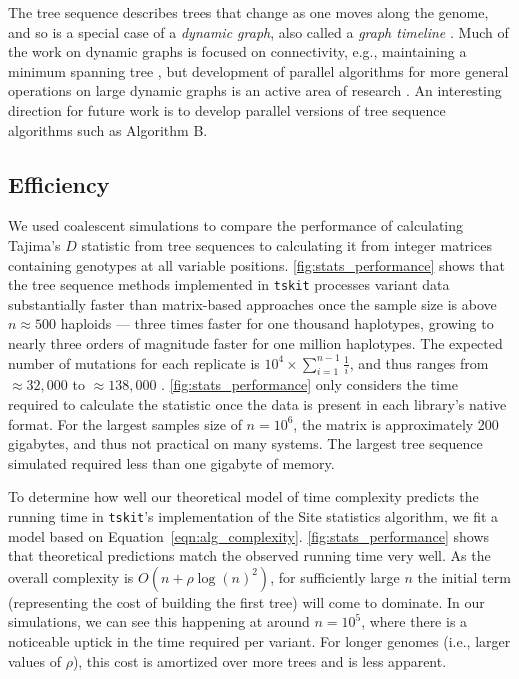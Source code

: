 \documentclass[9pt,twoside,lineno]{gsajnl}
\newcommand{\tskit}{{\texttt{tskit}}}
\begin{document}
The tree sequence describes trees that change as one moves along the genome,
and so is a special case of a \emph{dynamic graph},
also called a \emph{graph timeline} \citep{lacki2013reachability}.
Much of the work on dynamic graphs is focused on connectivity,
e.g., maintaining a minimum spanning tree \citep{eppstein1994offline, eppstein1997sparsification, holm2001polylogarithmic},
but development of parallel algorithms for more general operations on large dynamic graphs
is an active area of research \citep[e.g.,][]{srinivasan2018sharedmemory}.
An interesting direction for future work is to develop
parallel versions of tree sequence algorithms such as Algorithm B.

\subsection*{Efficiency}

We used coalescent simulations to compare the performance of calculating Tajima's \citeyearpar{Tajima1989-de} $D$
statistic from tree sequences to calculating it from integer matrices containing genotypes at all variable positions.
\autoref{fig:stats_performance} shows that the tree sequence methods implemented in \texttt{tskit} processes variant data
substantially faster than matrix-based approaches once the sample size is above $n \approx 500$ haploids ---
three times faster for one thousand haplotypes,
growing to nearly three orders of magnitude faster for one million haplotypes.
The expected number of mutations for each replicate is $10^4 \times \sum_{i=1}^{n-1}\frac{1}{i}$, and thus ranges from
$\approx 32,000$ to $\approx 138,000$ \citep{Watterson1975-ej}.
\autoref{fig:stats_performance} only considers the time required to calculate the statistic
once the data is present in each library's native format.
For the largest samples size of $n=10^6$,
the matrix is approximately 200 gigabytes, and thus not practical on many systems.
The largest tree sequence simulated required less than one gigabyte of memory.

To determine how well our theoretical model of time complexity predicts the
running time in \tskit{}'s implementation of the Site statistics algorithm,
we fit a model based on Equation~\eqref{eqn:alg_complexity}.
\autoref{fig:stats_performance} shows that theoretical predictions match
the observed running time very well. As the overall complexity is
$O(n + \rho \log(n)^2)$, for sufficiently large $n$ the initial term
(representing the cost of building the first tree) will come to dominate.
In our simulations, we can see this happening at around $n = 10^5$, where there
is a noticeable uptick in the time required per variant. For
longer genomes (i.e., larger values of $\rho$), this cost is amortized over more trees
and is less apparent.
\end{document}
